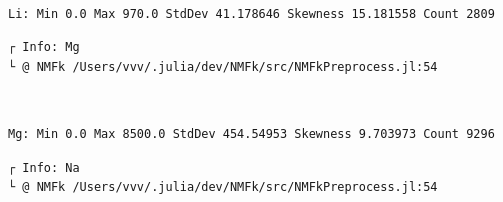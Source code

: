 \documentclass[11pt]{article}
\begin{document}
    \begin{center}
    \end{center}
    { \hspace*{\fill} \\}

    \begin{Verbatim}[commandchars=\\\{\}]
Li: Min 0.0 Max 970.0 StdDev 41.178646 Skewness 15.181558 Count 2809
    \end{Verbatim}

    \begin{Verbatim}[commandchars=\\\{\}]
┌ Info: Mg
└ @ NMFk /Users/vvv/.julia/dev/NMFk/src/NMFkPreprocess.jl:54
    \end{Verbatim}

    \begin{center}
    \end{center}
    { \hspace*{\fill} \\}

    \begin{Verbatim}[commandchars=\\\{\}]
Mg: Min 0.0 Max 8500.0 StdDev 454.54953 Skewness 9.703973 Count 9296
    \end{Verbatim}

    \begin{Verbatim}[commandchars=\\\{\}]
┌ Info: Na
└ @ NMFk /Users/vvv/.julia/dev/NMFk/src/NMFkPreprocess.jl:54
    \end{Verbatim}

    \begin{center}
    \end{center}
    { \hspace*{\fill} \\}
\end{document}
